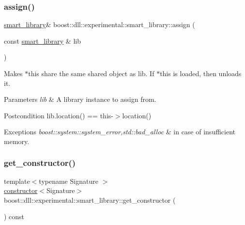 \subsubsection{\texorpdfstring{assign()}{assign()}}
{\footnotesize\ttfamily \hyperlink{a01712}{smart\+\_\+library}\& boost\+::dll\+::experimental\+::smart\+\_\+library\+::assign (\begin{DoxyParamCaption}\item[{const \hyperlink{a01712}{smart\+\_\+library} \&}]{lib }\end{DoxyParamCaption})\hspace{0.3cm}{\ttfamily [inline]}}





Makes $\ast$this share the same shared object as lib. If $\ast$this is loaded, then unloads it.


\begin{DoxyParams}{Parameters}
{\em lib} & A library instance to assign from. \\
\hline
\end{DoxyParams}
\begin{DoxyPostcond}{Postcondition}
lib.\+location() == this-\/$>$location() 
\end{DoxyPostcond}

\begin{DoxyExceptions}{Exceptions}
{\em boost\+::system\+::system\+\_\+error,std\+::bad\+\_\+alloc} & in case of insufficient memory. \\
\hline
\end{DoxyExceptions}
\mbox{\label{a01712_a0b2f9a2756ffad487537c03a07ee533a}} 
\subsubsection{\texorpdfstring{get\+\_\+constructor()}{get\_constructor()}}
{\footnotesize\ttfamily template$<$typename Signature $>$ \\
\hyperlink{a01352}{constructor}$<$Signature$>$ boost\+::dll\+::experimental\+::smart\+\_\+library\+::get\+\_\+constructor (\begin{DoxyParamCaption}{ }\end{DoxyParamCaption}) const\hspace{0.3cm}{\ttfamily [inline]}}

